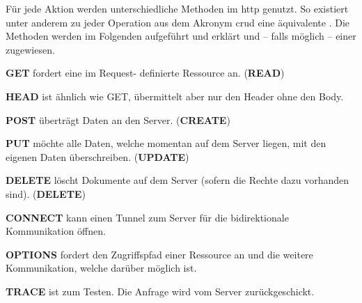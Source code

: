 	Für jede Aktion werden unterschiedliche Methoden im \gls{http} genutzt.
	So existiert unter anderem zu jeder Operation aus dem Akronym \gls{crud} eine äquivalente \httpMethode.
	Die Methoden werden im Folgenden aufgeführt und erklärt und
	-- falls möglich --
	einer \crudOperation{} zugewiesen.
	\begin{compactitem}
		\item{\textbf{GET}}\label{itm:httpget} fordert eine im Request-
		definierte Ressource an. (\textbf{READ})

		\item{\textbf{HEAD}}\label{itm:httphead} ist ähnlich wie GET, übermittelt aber nur den Header ohne den Body.

		\item{\textbf{POST}}\label{itm:httppost} überträgt Daten an den Server. (\textbf{CREATE})

		\item{\textbf{PUT}}\label{itm:httpput} möchte alle Daten, welche momentan auf dem Server liegen,
		mit den eigenen Daten überschreiben. (\textbf{UPDATE})

		\item{\textbf{DELETE}}\label{itm:httpdelete} löscht Dokumente auf dem Server
		(sofern die Rechte dazu vorhanden sind). (\textbf{DELETE})

		\item{\textbf{CONNECT}}\label{itm:httpconnect} kann einen Tunnel zum Server
		für die bidirektionale Kommunikation öffnen.

		\item{\textbf{OPTIONS}}\label{itm:httpoptions} fordert den Zugriffspfad einer Ressource an
		und die weitere Kommunikation, welche darüber möglich ist.

		\item{\textbf{TRACE}}\label{itm:httptrace} ist zum Testen.
		Die Anfrage wird vom Server zurückgeschickt.
	\end{compactitem}